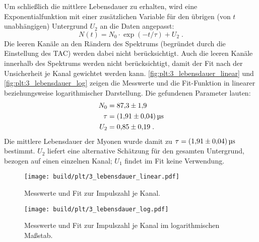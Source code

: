 Um schließlich die mittlere Lebensdauer zu erhalten,
wird eine Exponentialfunktion mit einer zusätzlichen Variable für den übrigen (von $t$ unabhängigen) Untergrund $U_2$ an die Daten angepasst:
\begin{equation*}
    N(t) = N_0 \cdot \exp (-t / \tau) + U_2 \; .
\end{equation*}
Die leeren Kanäle an den Rändern des Spektrums (begründet durch die Einstellung des \ac{TAC}) werden dabei nicht berücksichtigt.
Auch die leeren Kanäle innerhalb des Spektrums werden nicht berücksichtigt,
damit der Fit nach der Unsicherheit je Kanal gewichtet werden kann.
\autoref{fig:plt:3_lebensdauer_linear} und \autoref{fig:plt:3_lebensdauer_log} zeigen die Messwerte und die Fit-Funktion
in linearer beziehungsweise logarithmischer Darstellung.
Die gefundenen Parameter lauten:
\begin{align*}
    N_0 &= \num{87.3 \pm 1.9} \\
    \tau &= \SI{1.91 \pm 0.04}{\micro\second} \\
    U_2 &= \num{0.85 \pm 0.19} \; .
\end{align*}
Die mittlere Lebensdauer der Myonen wurde damit zu $\tau = \SI{1.91 \pm 0.04}{\micro\second}$ bestimmt.
$U_2$ liefert eine alternative Schätzung für den gesamten Untergrund, bezogen auf einen einzelnen Kanal;
$U_1$ findet im Fit keine Verwendung.

\begin{figure}
    \centering
    \texttt{[image: build/plt/3\_lebensdauer\_linear.pdf]}
    \caption{Messwerte und Fit zur Impulszahl je Kanal.}
    \label{fig:plt:3_lebensdauer_linear}
\end{figure}

\begin{figure}
    \centering
    \texttt{[image: build/plt/3\_lebensdauer\_log.pdf]}
    \caption{Messwerte und Fit zur Impulszahl je Kanal im logarithmischen Maßstab.}
    \label{fig:plt:3_lebensdauer_log}
\end{figure}
